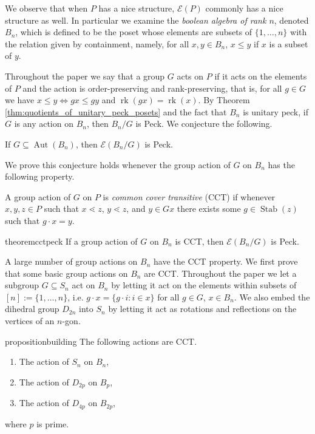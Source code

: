 \documentclass[smallextended]{svjour3}       %
\numberwithin{equation}{section}
\renewcommand{\iff}{\Leftrightarrow}
\newcommand\rk{\operatorname{rk}}
\newcommand\Stab{\operatorname{Stab}}
\newcommand\Aut{\operatorname{Aut}}
\begin{document}
We observe that when $P$ has a nice structure, $\mathcal E(P)$ commonly has a nice structure as well.  In particular we examine the \textit{boolean algebra of rank $n$}, denoted $B_n$, which is defined to be the poset whose elements are subsets of $\{1,\ldots,n\}$ with the relation given by containment, namely, for all $x,y\in B_n$, $x\le y$ if $x$ is a subset of $y$.

Throughout the paper we say that a group $G$ acts on $P$ if it acts on the elements of $P$ and the action is order-preserving and rank-preserving, that is, for all $g \in G$ we have $x \leq y \iff gx \leq gy$ and $\rk(gx) = \rk(x)$.  By Theorem \ref{thm:quotients_of_unitary_peck_posets} and the fact that $B_n$ is unitary peck, if $G$ is any action on $B_n$, then $B_n/G$ is Peck.  We conjecture the following.

\begin{conjecture}\label{conj:F_of_BnG_Peck}
If $G \subseteq \Aut(B_n)$, then $\mathcal E(B_n/G)$ is Peck.
\end{conjecture}

We prove this conjecture holds whenever the group action of $G$ on $B_n$ has the following property.

\begin{definition}
\label{defn:cover_transitive}
A group action of $G$ on $P$ is \textit{common cover transitive} (CCT) if whenever $x,y,z\in P$ such that $x\lessdot z$, $y\lessdot z$, and $y\in Gx$ there exists some $g\in \Stab(z)$ such that $g\cdot x = y$.
\end{definition}

\begin{restatable}{theorem}{cctpeck}
\label{thm:cover_transitive_implies_Peck}
If a group action of $G$ on $B_n$ is CCT, then $\mathcal E(B_n/G)$ is Peck.
\end{restatable}

A large number of group actions on $B_n$ have the CCT property.  We first prove that some basic group actions on $B_n$ are CCT.  Throughout the paper we let a subgroup $G\subseteq S_n$ act on $B_n$ by letting it act on the elements within subsets of $[n]:= \{1,\ldots, n\}$, i.e. $g\cdot x = \{g\cdot i\colon i\in x\}$  for all $g\in G$, $x\in B_n$.  We also embed the dihedral group $D_{2n}$ into $S_n$ by letting it act as rotations and reflections on the vertices of an $n$-gon.

\begin{restatable}{proposition}{building}
\label{prop:cover_transitive_building_blocks}
 The following actions are CCT.
\begin{enumerate}
\item The action of $S_n$ on $B_n$,
\item The action of $D_{2p}$ on $B_p$,
\item The action of $D_{4p}$ on $B_{2p}$,
\end{enumerate} where $p$ is prime. 
\end{restatable}
\end{document}

